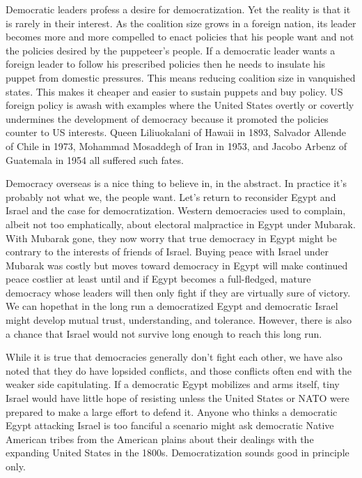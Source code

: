 \documentclass[10pt]{article}
\begin{document}
{\large Democratic leaders profess a desire for democratization. Yet the reality
is that it is rarely in their interest. As the coalition size grows in a foreign
nation, its leader becomes more and more compelled to enact policies that his
people want and not the policies desired by the puppeteer's people. If a
democratic leader wants a foreign leader to follow his prescribed policies then
he needs to insulate his puppet from domestic pressures. This means reducing
coalition size in vanquished states. This makes it cheaper and easier to sustain
puppets and buy policy. US foreign policy is awash with examples where the United
States overtly or covertly undermines the development of democracy because it
promoted the policies counter to US interests. Queen Liliuokalani of Hawaii in
1893, Salvador Allende of Chile in 1973, Mohammad Mosaddegh of Iran in 1953, and
Jacobo Arbenz of Guatemala in 1954 all suffered such fates.}

{\large Democracy overseas is a nice thing to believe in, in the abstract. In
practice it's probably not what we, the people want. Let's return to reconsider
Egypt and Israel and the case for democratization. Western democracies used to
complain, albeit not too emphatically, about electoral malpractice in Egypt under
Mubarak. With Mubarak gone, they now worry that true democracy in Egypt might be
contrary to the interests of friends of Israel. Buying peace with Israel under
Mubarak was costly but moves toward democracy in Egypt will make continued peace
costlier at least until and if Egypt becomes a full-fledged, mature democracy
whose leaders will then only fight if they are virtually sure of victory. We can
hopethat in the long run a democratized Egypt and democratic Israel might develop
mutual trust, understanding, and tolerance. However, there is also a chance that
Israel would not survive long enough to reach this long run.}

{\large While it is true that democracies generally don't fight each other, we
have also noted that they do have lopsided conflicts, and those conflicts often
end with the weaker side capitulating. If a democratic Egypt mobilizes and arms
itself, tiny Israel would have little hope of resisting unless the United States
or NATO were prepared to make a large effort to defend it. Anyone who thinks a
democratic Egypt attacking Israel is too fanciful a scenario might ask democratic
Native American tribes from the American plains about their dealings with the
expanding United States in the 1800s. Democratization sounds good in principle
only.}
\end{document}
